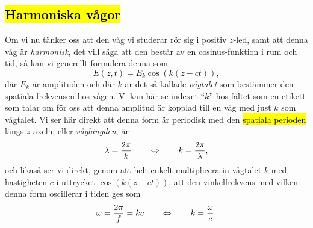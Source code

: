 {{{{{\subsection{{\hl{Harmoniska v{\aa}gor}}}
Om vi nu t{\"a}nker oss att den v{\aa}g vi studerar r{\"o}r sig i positiv
$z$-led, samt att denna v{\aa}g {\"a}r {\it harmonisk}, det vill s{\"a}ga att
den best{\aa}r av en cosinus-funktion i rum och tid,
s{\aa} kan vi generellt formulera denna som
\hl{$$
  E(z,t)=E_k\cos(k(z-ct)),
$$}
d{\"a}r $E_k$ {\"a}r amplituden och d{\"a}r $k$ {\"a}r det s{\aa} kallade
{\it v{\aa}gtalet} som best{\"a}mmer den spatiala frekvensen hos v{\aa}gen.
Vi kan h{\"a}r se indexet
``$k$'' hos f{\"a}ltet som en etikett som talar om f{\"o}r oss att denna
amplitud {\"a}r kopplad till en v{\aa}g med just $k$ som v{\aa}gtalet.
\medskip
{}
\medskip
\noindent
Vi ser h{\"a}r direkt att denna form {\"a}r periodisk med den {\hl{spatiala
perioden}}
l{\"a}ngs $z$-axeln, eller {\it v{\aa}gl{\"a}ngden}, {\"a}r
\hl{$$
  \lambda={{2\pi}\over{k}}
  \qquad\Leftrightarrow\qquad
  k={{2\pi}\over{\lambda}},
$$}
och likas{\aa} ser vi direkt, genom att helt enkelt multiplicera in v{\aa}gtalet
$k$ med hastigheten $c$ i uttrycket $\cos(k(z-ct))$, att den vinkelfrekvens med
vilken denna form oscillerar i tiden ges som
\hl{$$
  \omega={{2\pi}\over{f}}=kc
  \qquad\Leftrightarrow\qquad
  k={{\omega}\over{c}}.
$$}

}}}}}

